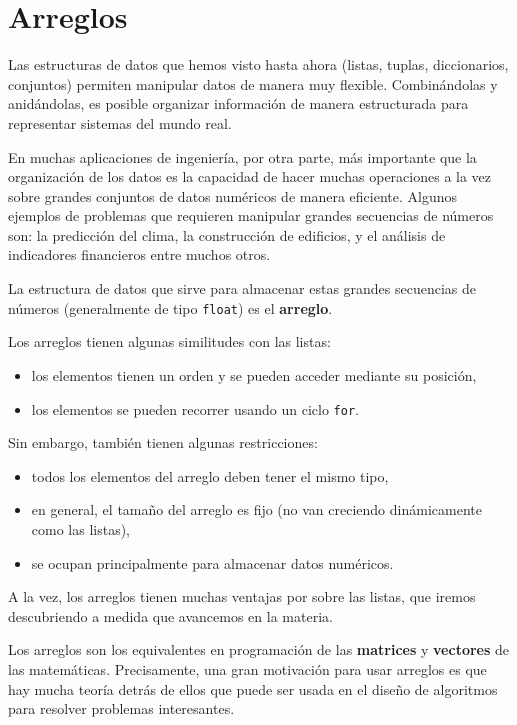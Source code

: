 \chapter{Arreglos}

Las estructuras de datos que hemos visto hasta ahora (listas, tuplas,
diccionarios, conjuntos) permiten manipular datos de manera muy
flexible. Combinándolas y anidándolas, es posible organizar información
de manera estructurada para representar sistemas del mundo real.

En muchas aplicaciones de ingeniería, por otra parte, más importante que
la organización de los datos es la capacidad de hacer muchas operaciones
a la vez sobre grandes conjuntos de datos numéricos de manera eficiente.
Algunos ejemplos de problemas que requieren manipular grandes secuencias
de números son: la predicción del clima, la construcción de edificios, y
el análisis de indicadores financieros entre muchos otros.

La estructura de datos que sirve para almacenar estas grandes secuencias
de números (generalmente de tipo \lstinline!float!) es el
\textbf{arreglo}.

Los arreglos tienen algunas similitudes con las listas:
\begin{itemize}
\item
  los elementos tienen un orden y se pueden acceder mediante su
  posición,
\item
  los elementos se pueden recorrer usando un ciclo \lstinline!for!.
\end{itemize}
Sin embargo, también tienen algunas restricciones:
\begin{itemize}
\item
  todos los elementos del arreglo deben tener el mismo tipo,
\item
  en general, el tamaño del arreglo es fijo (no van creciendo
  dinámicamente como las listas),
\item
  se ocupan principalmente para almacenar datos numéricos.
\end{itemize}

A la vez, los arreglos tienen muchas ventajas por sobre las listas, que
iremos descubriendo a medida que avancemos en la materia.

Los arreglos son los equivalentes en programación de las
\textbf{matrices} y \textbf{vectores} de las matemáticas. Precisamente,
una gran motivación para usar arreglos es que hay mucha teoría detrás de
ellos que puede ser usada en el diseño de algoritmos para resolver
problemas interesantes.

